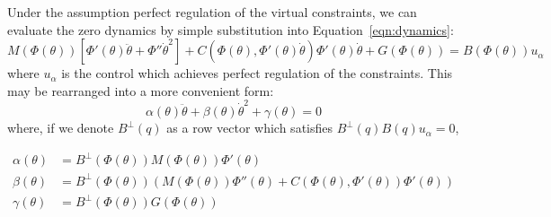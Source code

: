 Under the assumption perfect regulation of the virtual constraints, we can evaluate the zero dynamics by simple substitution into Equation~\ref{eqn:dynamics}:
\begin{equation*}
	M\left(\Phi(\theta)\right)\left[\Phi'(\theta)\ddot{\theta} + \Phi''\dot{\theta}^2\right] + 
	C\left(\Phi(\theta),\Phi'(\theta)\dot{\theta}\right)\Phi'(\theta)\dot{\theta} +
	G\left(\Phi(\theta)\right) = B\left(\Phi(\theta)\right)u_\alpha
\end{equation*}%
where $u_\alpha$ is the control which achieves perfect regulation of the constraints. This may be rearranged into a more convenient form:
\begin{equation} \label{eqn:zerodyn}
	\alpha(\theta)\ddot{\theta} + \beta(\theta)\dot{\theta}^2 + \gamma(\theta) = 0
\end{equation}
where, if we denote $B^{\perp}(q)$ as a row vector which satisfies $B^{\perp}(q)B(q)u_\alpha = 0$,
\addtocounter{equation}{-1}
\begin{subequations}
\begin{align}
	\alpha(\theta) &= B^{\bot}\left(\Phi(\theta)\right)M\left(\Phi(\theta)\right)\Phi'(\theta) \\
	\beta(\theta) &= B^{\bot}\left(\Phi(\theta)\right)\left(M\left(\Phi(\theta)\right)\Phi''(\theta)
		+C\left(\Phi(\theta),\Phi'(\theta)\right)\Phi'(\theta) \right) \\
	\gamma(\theta) &= B^{\bot}\left(\Phi(\theta)\right)G\left(\Phi(\theta)\right)
\end{align}
\end{subequations}

